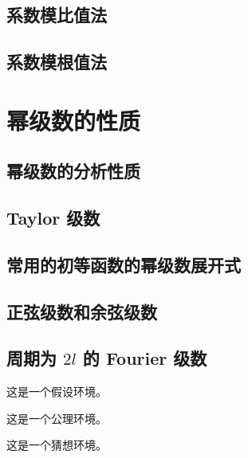 \documentclass[lang = zh , final , oneside , openany , titlepage , zihao = -4 , linespread = 1.3 , baselineskip = false , cjk-font = windows , text-font = newtx , math-font = newtx]{sjtureport}
\begin{document}
\subsection{系数模比值法}

\subsection{系数模根值法}

\section{幂级数的性质}

\subsection{幂级数的分析性质}

\subsection{Taylor 级数}

\subsection{常用的初等函数的幂级数展开式}

\subsection{正弦级数和余弦级数}

\subsection{周期为 $2l$ 的 Fourier 级数}

\begin{assumption}
    这是一个假设环境。
\end{assumption}

\begin{axiom}
    这是一个公理环境。
\end{axiom}

\begin{conjecture}
    这是一个猜想环境。
\end{conjecture}

\nocite{*}

\end{document}
